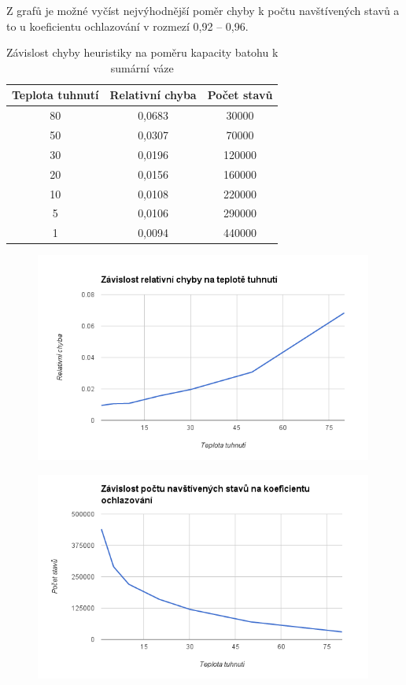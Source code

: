 \documentclass[10pt,a4paper]{article}
\begin{document}
Z grafů je možné vyčíst nejvýhodnější poměr chyby k počtu navštívených stavů a to u koeficientu ochlazování v rozmezí 0,92 -- 0,96.


\begin{table}[H]
\centering
  \begin{tabular}{ |c|c|c|}
  \hline
  Teplota tuhnutí & Relativní chyba & Počet stavů \\
  \hline
  80 & 0,0683 & 30000 \\
  50 & 0,0307 & 70000 \\
  30 & 0,0196 & 120000 \\ 
  20 & 0,0156 & 160000 \\
  10 & 0,0108 & 220000 \\
  5  & 0,0106 & 290000 \\    
  1  & 0,0094 & 440000 \\     
  \hline
  \end{tabular}
  \caption{Závislost chyby heuristiky na poměru kapacity batohu k sumární váze}
\end{table}

\begin{figure}[H]\centering
 \includegraphics[width=0.99\textwidth]{5}
\end{figure}

\begin{figure}[H]\centering
 \includegraphics[width=0.99\textwidth]{6}
\end{figure}
\end{document}
